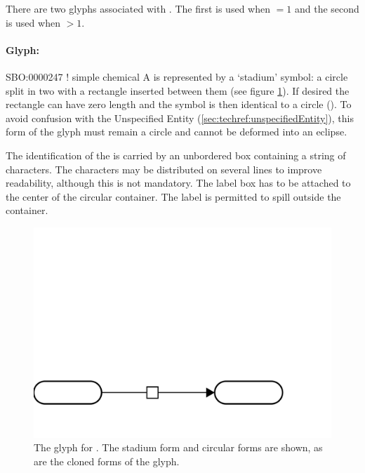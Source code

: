 There are two glyphs associated with . The
first  is used when  $= 1$
and the second  is used when
 $> 1$.

\paragraph{Glyph: }

\begin{glyphDescription}
  \glyphSboTerm SBO:0000247 ! simple chemical \glyphContainer A
   is represented by a `stadium' symbol: a
  circle split in two with a rectangle inserted between them (see
  figure \ref{fig:techref:simpleChemical}). If desired the rectangle can have
  zero length and the symbol is then identical to a circle
  (). To avoid confusion with the Unspecified
  Entity (\ref{sec:techref:unspecifiedEntity}), this form of the glyph must remain a
  circle and cannot be deformed into an eclipse.

  \glyphLabel The identification of the  is
  carried by an unbordered box containing a string of characters.  The
  characters may be distributed on several lines to improve
  readability, although this is not mandatory.  The label box has to
  be attached to the center of the circular container.  The label is
  permitted to spill outside the container.
\end{glyphDescription}

\begin{figure}[htb]
  \centering
  \includegraphics[scale = 0.3]{images/simpleChemical}
  \caption{The \PD glyph for . The stadium
    form and circular forms are shown, as are the cloned forms of the glyph.}
  \label{fig:techref:simpleChemical}
\end{figure}

